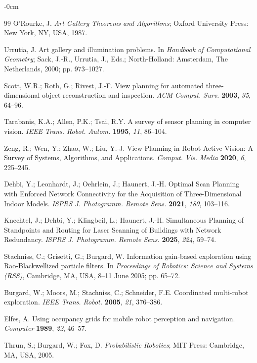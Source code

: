 \documentclass[sensors,article,submit,pdftex,moreauthors]{Definitions/mdpi}
\begin{document}
\begin{adjustwidth}{-\extralength}{0cm}
\begin{thebibliography}{99}
O'Rourke, J. \textit{Art Gallery Theorems and Algorithms}; Oxford University Press: New York, NY, USA, 1987.

Urrutia, J. Art gallery and illumination problems. In \textit{Handbook of Computational Geometry}; Sack, J.-R., Urrutia, J., Eds.; North-Holland: Amsterdam, The Netherlands, 2000; pp. 973--1027.

Scott, W.R.; Roth, G.; Rivest, J.-F. View planning for automated three-dimensional object reconstruction and inspection. \textit{ACM Comput. Surv.} \textbf{2003}, \textit{35}, 64--96.

Tarabanis, K.A.; Allen, P.K.; Tsai, R.Y. A survey of sensor planning in computer vision. \textit{IEEE Trans. Robot. Autom.} \textbf{1995}, \textit{11}, 86--104.

Zeng, R.; Wen, Y.; Zhao, W.; Liu, Y.-J. View Planning in Robot Active Vision: A Survey of Systems, Algorithms, and Applications. \textit{Comput. Vis. Media} \textbf{2020}, \textit{6}, 225--245.

Dehbi, Y.; Leonhardt, J.; Oehrlein, J.; Haunert, J.-H. Optimal Scan Planning with Enforced Network Connectivity for the Acquisition of Three-Dimensional Indoor Models. \textit{ISPRS J. Photogramm. Remote Sens.} \textbf{2021}, \textit{180}, 103--116.

Knechtel, J.; Dehbi, Y.; Klingbeil, L.; Haunert, J.-H. Simultaneous Planning of Standpoints and Routing for Laser Scanning of Buildings with Network Redundancy. \textit{ISPRS J. Photogramm. Remote Sens.} \textbf{2025}, \textit{224}, 59--74.

Stachniss, C.; Grisetti, G.; Burgard, W. Information gain-based exploration using Rao-Blackwellized particle filters. In \textit{Proceedings of Robotics: Science and Systems (RSS)}, Cambridge, MA, USA, 8--11 June 2005; pp. 65--72.

Burgard, W.; Moors, M.; Stachniss, C.; Schneider, F.E. Coordinated multi-robot exploration. \textit{IEEE Trans. Robot.} \textbf{2005}, \textit{21}, 376--386.

Elfes, A. Using occupancy grids for mobile robot perception and navigation. \textit{Computer} \textbf{1989}, \textit{22}, 46--57.

Thrun, S.; Burgard, W.; Fox, D. \textit{Probabilistic Robotics}; MIT Press: Cambridge, MA, USA, 2005.


\end{thebibliography}
\end{adjustwidth}
\end{document}
